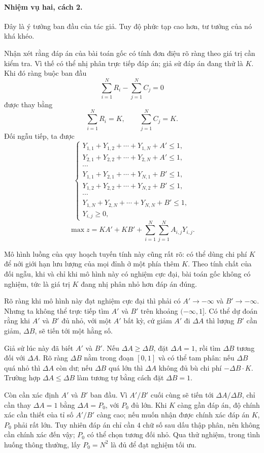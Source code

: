 \documentclass[11pt]{article}
\begin{document}
\paragraph{Nhiệm vụ hai, cách 2.}
Đây là ý tưởng ban đầu của tác giả. Tuy độ phức tạp cao hơn, tư tưởng của nó
khá khéo.

Nhận xét rằng đáp án của bài toán gốc có tính đơn điệu rõ ràng theo giá trị cần
kiểm tra. Vì thế có thể nhị phân trực tiếp đáp án; giả sử đáp án đang thử là
\(K\). Khi đó ràng buộc ban đầu
\[
  \sum_{i=1}^{N}R_i-\sum_{j=1}^{N}C_j=0
\]
được thay bằng
\[
  \sum_{i=1}^{N}R_i=K,\qquad
  \sum_{j=1}^{N}C_j=K.
\]
Đối ngẫu tiếp, ta được
\[
\begin{cases}
Y_{1,1}+Y_{1,2}+\cdots+Y_{1,N}+A'\le1,\\
Y_{2,1}+Y_{2,2}+\cdots+Y_{2,N}+A'\le1,\\
\cdots\\
Y_{1,1}+Y_{2,1}+\cdots+Y_{N,1}+B'\le1,\\
Y_{1,2}+Y_{2,2}+\cdots+Y_{N,2}+B'\le1,\\
\cdots\\
Y_{1,N}+Y_{2,N}+\cdots+Y_{N,N}+B'\le1,\\
Y_{i,j}\ge0,
\end{cases}
\]
\[
  \max z=K A'+K B'+\sum_{i=1}^{N}\sum_{j=1}^{N}A_{i,j}Y_{i,j}.
\]

Mô hình luồng của quy hoạch tuyến tính này cũng rất rõ: có thể dùng chi phí
\(K\) để nới giới hạn lưu lượng của mọi đỉnh ở một phía thêm \(K\). Theo tính
chất của đối ngẫu, khi và chỉ khi mô hình này có nghiệm cực đại, bài toán gốc
không có nghiệm, tức là giá trị \(K\) đang nhị phân nhỏ hơn đáp án đúng.

Rõ ràng khi mô hình này đạt nghiệm cực đại thì phải có \(A'\to-\infty\) và
\(B'\to-\infty\). Nhưng ta không thể trực tiếp tìm \(A'\) và \(B'\) trên khoảng
\((-\infty,1]\). Có thể dự đoán rằng khi \(A'\) và \(B'\) đủ nhỏ, với một
\(A'\) bất kỳ, cứ giảm \(A'\) đi \(\Delta A\) thì lượng \(B'\) cần giảm,
\(\Delta B\), sẽ tiến tới một hằng số.

Giả sử lúc này đã biết \(A'\) và \(B'\). Nếu \(\Delta A\ge\Delta B\), đặt
\(\Delta A=1\), rồi tìm \(\Delta B\) tương đối với \(\Delta A\). Rõ ràng
\(\Delta B\) nằm trong đoạn \([0,1]\) và có thể tam phân: nếu \(\Delta B\) quá
nhỏ thì \(\Delta A\) còn dư; nếu \(\Delta B\) quá lớn thì \(\Delta A\) không đủ
bù chi phí \(-\Delta B\cdot K\). Trường hợp \(\Delta A\le\Delta B\) làm tương
tự bằng cách đặt \(\Delta B=1\).

Còn cần xác định \(A'\) và \(B'\) ban đầu. Vì \(A'/B'\) cuối cùng sẽ tiến tới
\(\Delta A/\Delta B\), chỉ cần thay \(\Delta A=1\) bằng \(\Delta A=P_0\), với
\(P_0\) đủ lớn. Khi \(K\) càng gần đáp án, độ chính xác cần thiết của tỉ số
\(A'/B'\) càng cao; nếu muốn nhận được chính xác đáp án \(K\), \(P_0\) phải rất
lớn. Tuy nhiên đáp án chỉ cần \(4\) chữ số sau dấu thập phân, nên không cần
chính xác đến vậy; \(P_0\) có thể chọn tương đối nhỏ. Qua thử nghiệm, trong tình
huống thông thường, lấy \(P_0=N^2\) là đủ để đạt nghiệm tối ưu.
\end{document}
